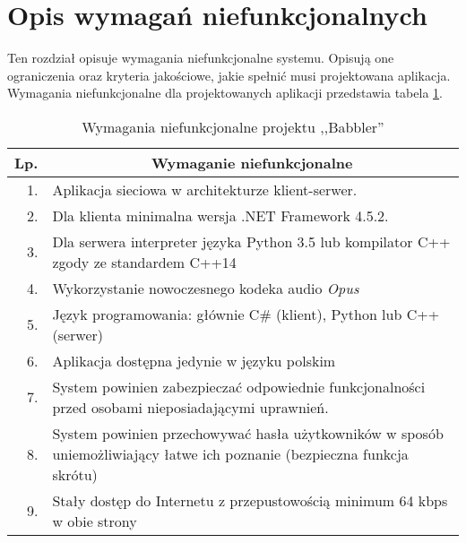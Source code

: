 \section{Opis wymagań niefunkcjonalnych}
Ten rozdział opisuje wymagania niefunkcjonalne systemu. Opisują one ograniczenia oraz kryteria jakościowe, jakie spełnić musi projektowana aplikacja. Wymagania niefunkcjonalne dla projektowanych aplikacji przedstawia tabela \ref{tab:wymniefun}.

\begin{table}[!hbp]
	\centering
	\caption{Wymagania niefunkcjonalne projektu ,,Babbler''}
	\label{tab:wymniefun}
	\begin{tabular}{|r|p{\linewidth}|} \hline
		\multicolumn{1}{|c|}{\textbf{Lp.}} & \multicolumn{1}{|c|}{\textbf{Wymaganie niefunkcjonalne}} \\ \hline
		1. & Aplikacja sieciowa w architekturze klient-serwer. \\ \hline
		2. & Dla klienta minimalna wersja .NET Framework 4.5.2. \\ \hline
		3. & Dla serwera interpreter języka Python 3.5 lub kompilator C++ zgody ze standardem C++14 \\ \hline
		4. & Wykorzystanie nowoczesnego kodeka audio \textit{Opus} \\ \hline
		5. & Język programowania: głównie C\# (klient), Python lub C++ (serwer) \\ \hline
		6. & Aplikacja dostępna jedynie w języku polskim \\ \hline
		7. & System powinien zabezpieczać odpowiednie funkcjonalności przed osobami nieposiadającymi uprawnień. \\ \hline
		8. & System powinien przechowywać hasła użytkowników w sposób uniemożliwiający łatwe ich poznanie (bezpieczna funkcja skrótu) \\ \hline
		9. & Stały dostęp do Internetu z przepustowością minimum 64 kbps w obie strony \\ \hline
	\end{tabular}
\end{table}
